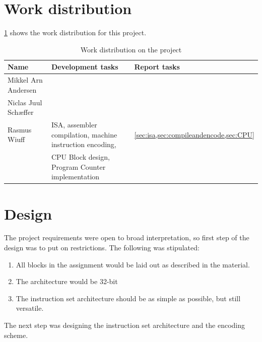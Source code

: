 \documentclass[a4paper, english]{article}
\numberwithin{equation}{section}
\begin{document}
\section{Work distribution}
\cref{tbl:ansvar} shows the work distribution for this project.
\begin{table}[H]
    \centering
    \caption{Work distribution on the project}\label{tbl:ansvar}
    \begin{tabular}{lll}
        \toprule
        Name                 & Development tasks                                         & Report tasks                                \\
        \midrule
        Mikkel Arn Andersen  &                                                           &                                             \\
        Niclas Juul Schæffer &                                                           &                                             \\
        Rasmus Wiuff         & ISA, assembler compilation, machine instruction encoding, & \cref{sec:isa,sec:compileandencode,sec:CPU} \\
                             & CPU Block design, Program Counter implementation          &                                             \\
        \bottomrule
    \end{tabular}
\end{table}
\section{Design}
The project requirements were open to broad interpretation, so first step of the design was to put on restrictions. The following was stipulated:
\begin{enumerate}
    \item All blocks in the assignment would be laid out as described in the material.
    \item The architecture would be 32-bit
    \item The instruction set architecture should be as simple as possible, but still versatile.
\end{enumerate}
The next step was designing the instruction set architecture and the encoding scheme.
\end{document}

